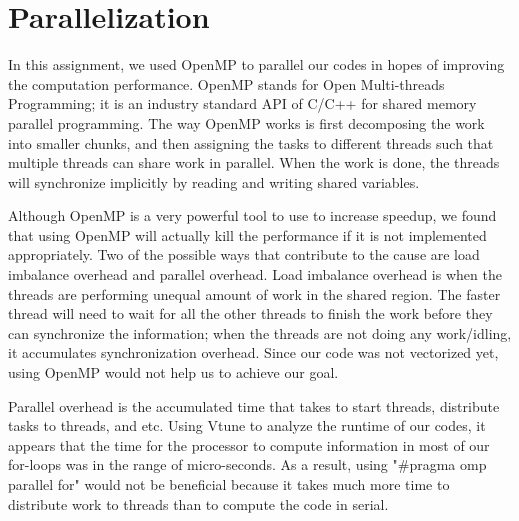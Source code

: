 \section{Parallelization}\label{sec:parallelization}

	In this assignment, we used OpenMP to parallel our codes in hopes of improving the computation performance. OpenMP stands for Open Multi-threads Programming; it is an industry standard API of C/C++ for shared memory parallel programming. The way OpenMP works is first decomposing the work into smaller chunks, and then assigning the tasks to different threads such that multiple threads can share work in parallel. When the work is done, the threads will synchronize implicitly by reading and writing shared variables.

	Although OpenMP is a very powerful tool to use to increase speedup, we found that using OpenMP will actually kill the performance if it is not implemented appropriately. Two of the possible ways that contribute to the cause are load imbalance overhead and parallel overhead. Load imbalance overhead is when the threads are performing unequal amount of work in the shared region. The faster thread will need to wait for all the other threads to finish the work before they can synchronize the information; when the threads are not doing any work/idling, it accumulates synchronization overhead. Since our code was not vectorized yet, using OpenMP would not help us to achieve our goal.

	Parallel overhead is the accumulated time that takes to start threads, distribute tasks to threads, and etc. Using Vtune to analyze the runtime of our codes, it appears that the time for the processor to compute information in most of our for-loops was in the range of micro-seconds. As a result, using "\#pragma omp parallel for" would not be beneficial because it takes much more time to distribute work to threads than to compute the code in serial.
